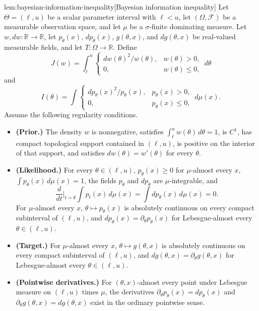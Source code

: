 \documentclass[11pt]{article}
\begin{document}
\begin{lemmav}{lem:bayesian-information-inequality}[Bayesian information inequality]
Let \(\Theta=(\ell,u)\) be a scalar parameter interval with \(\ell<u\), let \((\Omega,\mathcal F)\) be a measurable observation space, and let \(\mu\) be a \(\sigma\)-finite dominating measure.  Let \(w,dw:\mathbb R\to\mathbb R\), let \(p_\theta(x)\), \(dp_\theta(x)\), \(g(\theta,x)\), and \(dg(\theta,x)\) be real-valued measurable fields, and let \(T:\Omega\to\mathbb R\).  Define
\[
J(w)=\int_\ell^u
\begin{cases}
dw(\theta)^2/w(\theta),& w(\theta)>0,\\
0,& w(\theta)\le 0,
\end{cases}
\,d\theta
\]
and
\[
I(\theta)=\int
\begin{cases}
dp_\theta(x)^2/p_\theta(x),& p_\theta(x)>0,\\
0,& p_\theta(x)\le 0,
\end{cases}
\,d\mu(x).
\]
Assume the following regularity conditions.
\begin{itemize}
\item \textbf{(Prior.)}  The density \(w\) is nonnegative, satisfies \(\int_\ell^u w(\theta)\,d\theta=1\), is \(C^1\), has compact topological support contained in \((\ell,u)\), is positive on the interior of that support, and satisfies \(dw(\theta)=w'(\theta)\) for every \(\theta\).
\item \textbf{(Likelihood.)}  For every \(\theta\in(\ell,u)\), \(p_\theta(x)\ge 0\) for \(\mu\)-almost every \(x\), \(\int p_\theta(x)\,d\mu(x)=1\), the fields \(p_\theta\) and \(dp_\theta\) are \(\mu\)-integrable, and
\[
\frac{d}{dt}\bigg|_{t=\theta}\int p_t(x)\,d\mu(x)
=
\int dp_\theta(x)\,d\mu(x)
=
0.
\]
For \(\mu\)-almost every \(x\), \(\theta\mapsto p_\theta(x)\) is absolutely continuous on every compact subinterval of \((\ell,u)\), and \(dp_\theta(x)=\partial_\theta p_\theta(x)\) for Lebesgue-almost every \(\theta\in(\ell,u)\).
\item \textbf{(Target.)}  For \(\mu\)-almost every \(x\), \(\theta\mapsto g(\theta,x)\) is absolutely continuous on every compact subinterval of \((\ell,u)\), and \(dg(\theta,x)=\partial_\theta g(\theta,x)\) for Lebesgue-almost every \(\theta\in(\ell,u)\).
\item \textbf{(Pointwise derivatives.)}  For \((\theta,x)\)-almost every point under Lebesgue measure on \((\ell,u)\) times \(\mu\), the derivatives \(\partial_\theta p_\theta(x)=dp_\theta(x)\) and \(\partial_\theta g(\theta,x)=dg(\theta,x)\) exist in the ordinary pointwise sense.

\end{itemize}
\end{lemmav}
\end{document}
